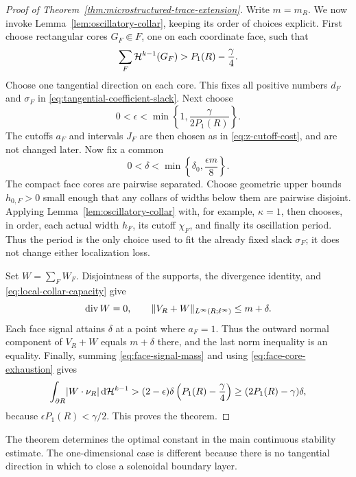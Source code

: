 \begin{proof}[Proof of Theorem~\ref{thm:microstructured-trace-extension}]
Write $m=m_R$.  We now invoke Lemma~\ref{lem:oscillatory-collar}, keeping its
order of choices explicit.  First choose rectangular cores $G_F\Subset F$,
one on each coordinate face, such that
\begin{equation}
\label{eq:face-core-exhaustion}
 \sum_F\mathcal{H}^{k-1}(G_F)>P_1(R)-\frac{\gamma}{4}.
\end{equation}
Choose one tangential direction on each core.  This fixes all positive
numbers $d_F$ and $\sigma_F$ in
\eqref{eq:tangential-coefficient-slack}.  Next choose
\[
 0<\epsilon<\min\left\{1,\frac{\gamma}{2P_1(R)}\right\}.
\]
The cutoffs $a_F$ and intervals $J_F$ are then chosen as in
\eqref{eq:z-cutoff-cost}, and are not changed later.  Now fix a common
\[
 0<\delta<\min\left\{\delta_0,\frac{\epsilon m}{8}\right\}.
\]
The compact face cores are pairwise separated.  Choose geometric upper bounds
$h_{0,F}>0$ small enough that any collars of widths below them are pairwise
disjoint.  Applying Lemma~\ref{lem:oscillatory-collar} with, for example,
$\kappa=1$, then chooses, in order, each actual width $h_F$, its cutoff
$\chi_F$, and finally its oscillation period.
Thus the period is the only choice used to fit the already fixed slack
$\sigma_F$; it does not change either localization loss.

Set $W=\sum_FW_F$.  Disjointness of the supports, the divergence identity, and
\eqref{eq:local-collar-capacity} give
\[
 \operatorname{div} W=0,
 \qquad
 \lVert V_R+W \rVert_{L^\infty(R;\ell^\infty)}\le m+\delta.
\]
Each face signal attains $\delta$ at a point where $a_F=1$.  Thus the outward
normal component of $V_R+W$ equals $m+\delta$ there, and the last norm
inequality is an equality.  Finally, summing \eqref{eq:face-signal-mass} and using
\eqref{eq:face-core-exhaustion} gives
\[
 \int_{\partial R}\lvert W\cdot\nu_R \rvert\,\mathrm{d}\mathcal{H}^{k-1}
 >(2-\epsilon)\delta\left(P_1(R)-\frac{\gamma}{4}\right)
 \ge(2P_1(R)-\gamma)\delta,
\]
because $\epsilon P_1(R)<\gamma/2$.  This proves the theorem.
\end{proof}

The theorem determines the optimal constant in the main continuous stability
estimate.  The one-dimensional case is different because there is no
tangential direction in which to close a solenoidal boundary layer.

